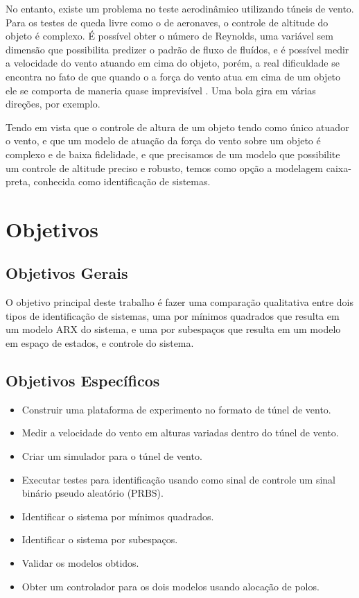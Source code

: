 No entanto, existe um problema no teste aerodinâmico utilizando túneis de vento. Para os testes de queda livre como o de aeronaves, o controle de altitude do objeto é complexo. É possível obter o número de Reynolds, uma variável sem dimensão que possibilita predizer o padrão de fluxo de fluídos, e é possível medir a velocidade do vento atuando em cima do objeto, porém, a real dificuldade se encontra no fato de que quando o a força do vento atua em cima de um objeto ele se comporta de maneria quase imprevisível  . Uma bola gira em várias direções, por exemplo.


Tendo em vista que o controle de altura de um objeto tendo como único atuador o vento, e que um modelo de atuação da força do vento sobre um objeto é complexo e de baixa fidelidade, e que precisamos de um modelo que possibilite um controle de altitude preciso e robusto, temos como opção a modelagem caixa-preta, conhecida como identificação de sistemas.


\section{Objetivos}

\subsection{Objetivos Gerais} 


O objetivo principal deste trabalho é fazer uma comparação qualitativa entre dois tipos  de identificação de sistemas, uma por mínimos quadrados que resulta em um modelo ARX do sistema, e uma por subespaços que resulta em um modelo em espaço de estados, e controle do sistema.

\subsection{Objetivos Específicos}


\begin{itemize}
	\item Construir uma plataforma de experimento no formato de túnel de vento.
	\item Medir a velocidade do vento em alturas variadas dentro do túnel de vento.
	\item Criar um simulador para o túnel de vento.
	\item Executar testes para identificação usando como sinal de controle um sinal binário pseudo aleatório (PRBS).
	\item Identificar o sistema por mínimos quadrados.
	\item Identificar o sistema por subespaços.
	\item Validar os modelos obtidos.
	\item Obter um controlador para os dois modelos usando alocação de polos.
\end{itemize}


